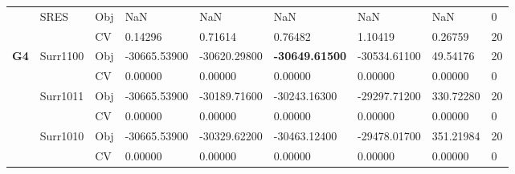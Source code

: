 \begin{table*}[!htb]
\begin{tabular}{lllllllll}
		& SRES                               & Obj                                & NaN                                & NaN                                & NaN                                  & NaN                                 & NaN                               & 0                \\
		&                                    & CV                                 & 0.14296                            & 0.71614                            & 0.76482                              & 1.10419                             & 0.26759                           & 20               \\ \hline
		\multirow{16}{*}{\textbf{G4}}           & Surr1100                           & Obj                                & -30665.53900                       & -30620.29800                       & \textbf{-30649.61500}                         & -30534.61100                        & 49.54176                          & 20               \\
		&                                    & CV                                 & 0.00000                            & 0.00000                            & 0.00000                              & 0.00000                             & 0.00000                           & 0                \\
		& Surr1011                           & Obj                                & -30665.53900                       & -30189.71600                       & -30243.16300                         & -29297.71200                        & 330.72280                         & 20               \\
		&                                    & CV                                 & 0.00000                            & 0.00000                            & 0.00000                              & 0.00000                             & 0.00000                           & 0                \\
		& Surr1010                           & Obj                                & -30665.53900                       & -30329.62200                       & -30463.12400                         & -29478.01700                        & 351.21984                         & 20               \\
		&                                    & CV                                 & 0.00000                            & 0.00000                            & 0.00000                              & 0.00000                             & 0.00000                           & 0                \\

\end{tabular}
\end{table*}
